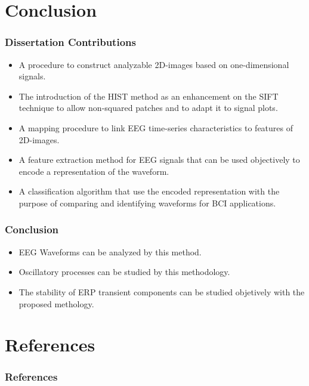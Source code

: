\documentclass[aspectratio=169]{beamer}
\begin{document}
    
    \section{Conclusion}
    \begin{frame}
        \frametitle{Dissertation Contributions}
        \begin{center}
            \begin{itemize}
                \item A procedure to construct analyzable 2D-images based on one-dimensional signals.
                \item The introduction of the HIST method as an enhancement on the SIFT technique to allow non-squared patches and to adapt it to signal plots.
                \item A mapping procedure to link EEG time-series characteristics to features of 2D-images.
                \item A feature extraction method for EEG signals that can be used objectively to encode a representation of the waveform.
                \item A classification algorithm that use the encoded representation with the purpose of comparing and identifying waveforms for BCI applications.
            \end{itemize}
        \end{center}
    \end{frame}    
    
\begin{frame}
\frametitle{Conclusion}
\begin{center}
\begin{itemize}
\item EEG Waveforms can be analyzed by this method.
\item Oscillatory processes can be studied by this methodology.
\item The stability of ERP transient components can be studied objetively with the proposed methology.
\end{itemize}
\end{center}
\end{frame}    
    
    
    \section{References}
    \begin{frame} %
        \frametitle{References}

    \end{frame}
    
\end{document}

